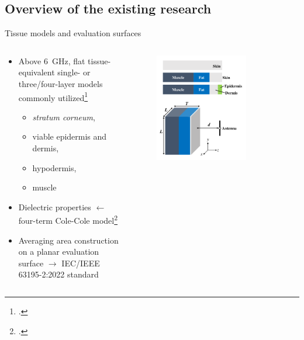 \documentclass[xcolor=dvipsnames,10pt]{beamer}
\begin{document}
\subsection[Overview of the existing research]{Overview of the existing research}
\begin{frame}{Tissue models and evaluation surfaces}
    \begin{columns}[c]
        \begin{column}{0.5\textwidth}
            \begin{itemize}
                \item Above \SI{6}{\GHz}, flat tissue-equivalent single- or three/four-layer models commonly utilized\footcite{Zhadobov2011Millimeter}
                    \begin{itemize}
                        \item \textit{stratum corneum},
                        \item viable epidermis and dermis,
                        \item hypodermis,
                        \item muscle
                    \end{itemize}
                \item Dielectric properties $\leftarrow$ four-term Cole-Cole model\footcite{Gabriel1996Compilation}
                \item Averaging area construction on a planar evaluation surface $\rightarrow$ IEC/IEEE 63195-2:2022 standard
            \end{itemize}
        \end{column}
        \begin{column}{0.5\textwidth}
            \begin{center}
            \begin{figure}
                \includegraphics[width=0.75\textwidth]{artwork/Li2021Figure2_adjusted.pdf}

\end{figure}
\end{center}
\end{column}
\end{columns}
\end{frame}
\end{document}
